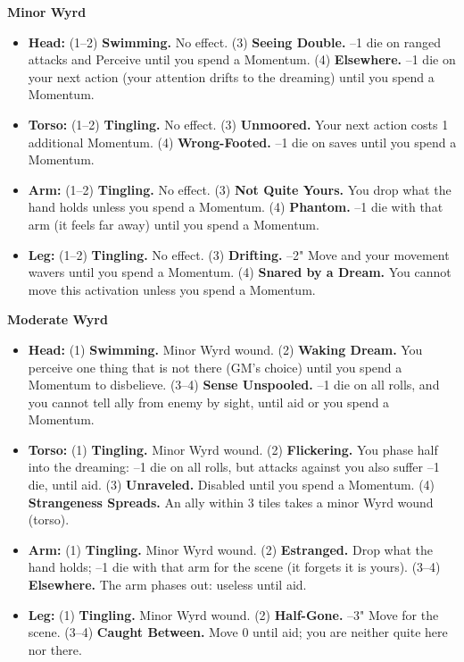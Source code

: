 \textbf{Minor Wyrd}
\begin{itemize}
    \item \textbf{Head:} (1--2) \textbf{Swimming.} No effect. (3) \textbf{Seeing Double.} --1 die on ranged attacks and Perceive until you spend a Momentum. (4) \textbf{Elsewhere.} --1 die on your next action (your attention drifts to the dreaming) until you spend a Momentum.
    \item \textbf{Torso:} (1--2) \textbf{Tingling.} No effect. (3) \textbf{Unmoored.} Your next action costs 1 additional Momentum. (4) \textbf{Wrong-Footed.} --1 die on saves until you spend a Momentum.
    \item \textbf{Arm:} (1--2) \textbf{Tingling.} No effect. (3) \textbf{Not Quite Yours.} You drop what the hand holds unless you spend a Momentum. (4) \textbf{Phantom.} --1 die with that arm (it feels far away) until you spend a Momentum.
    \item \textbf{Leg:} (1--2) \textbf{Tingling.} No effect. (3) \textbf{Drifting.} --2" Move and your movement wavers until you spend a Momentum. (4) \textbf{Snared by a Dream.} You cannot move this activation unless you spend a Momentum.
\end{itemize}

\textbf{Moderate Wyrd}
\begin{itemize}
    \item \textbf{Head:} (1) \textbf{Swimming.} Minor Wyrd wound. (2) \textbf{Waking Dream.} You perceive one thing that is not there (GM's choice) until you spend a Momentum to disbelieve. (3--4) \textbf{Sense Unspooled.} --1 die on all rolls, and you cannot tell ally from enemy by sight, until aid or you spend a Momentum.
    \item \textbf{Torso:} (1) \textbf{Tingling.} Minor Wyrd wound. (2) \textbf{Flickering.} You phase half into the dreaming: --1 die on all rolls, but attacks against you also suffer --1 die, until aid. (3) \textbf{Unraveled.} Disabled until you spend a Momentum. (4) \textbf{Strangeness Spreads.} An ally within 3 tiles takes a minor Wyrd wound (torso).
    \item \textbf{Arm:} (1) \textbf{Tingling.} Minor Wyrd wound. (2) \textbf{Estranged.} Drop what the hand holds; --1 die with that arm for the scene (it forgets it is yours). (3--4) \textbf{Elsewhere.} The arm phases out: useless until aid.
    \item \textbf{Leg:} (1) \textbf{Tingling.} Minor Wyrd wound. (2) \textbf{Half-Gone.} --3" Move for the scene. (3--4) \textbf{Caught Between.} Move 0 until aid; you are neither quite here nor there.
\end{itemize}

